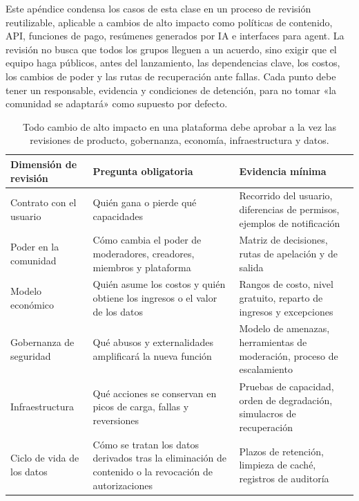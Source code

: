 \documentclass[a4paper]{article}
\begin{document}
Este apéndice condensa los casos de esta clase en un proceso de revisión reutilizable, aplicable a cambios de alto impacto como políticas de contenido, API, funciones de pago, resúmenes generados por IA e interfaces para agent. La revisión no busca que todos los grupos lleguen a un acuerdo, sino exigir que el equipo haga públicos, antes del lanzamiento, las dependencias clave, los costos, los cambios de poder y las rutas de recuperación ante fallas. Cada punto debe tener un responsable, evidencia y condiciones de detención, para no tomar «la comunidad se adaptará» como supuesto por defecto.

\begin{table}[H]
\centering
\begin{tabular}{L{0.18\textwidth}L{0.33\textwidth}L{0.39\textwidth}}
\toprule
Dimensión de revisión & Pregunta obligatoria & Evidencia mínima \\
\midrule
Contrato con el usuario & Quién gana o pierde qué capacidades & Recorrido del usuario, diferencias de permisos, ejemplos de notificación \\
Poder en la comunidad & Cómo cambia el poder de moderadores, creadores, miembros y plataforma & Matriz de decisiones, rutas de apelación y de salida \\
Modelo económico & Quién asume los costos y quién obtiene los ingresos o el valor de los datos & Rangos de costo, nivel gratuito, reparto de ingresos y excepciones \\
Gobernanza de seguridad & Qué abusos y externalidades amplificará la nueva función & Modelo de amenazas, herramientas de moderación, proceso de escalamiento \\
Infraestructura & Qué acciones se conservan en picos de carga, fallas y reversiones & Pruebas de capacidad, orden de degradación, simulacros de recuperación \\
Ciclo de vida de los datos & Cómo se tratan los datos derivados tras la eliminación de contenido o la revocación de autorizaciones & Plazos de retención, limpieza de caché, registros de auditoría \\
\bottomrule
\end{tabular}
\caption{Todo cambio de alto impacto en una plataforma debe aprobar a la vez las revisiones de producto, gobernanza, economía, infraestructura y datos.}
\end{table}
\end{document}
